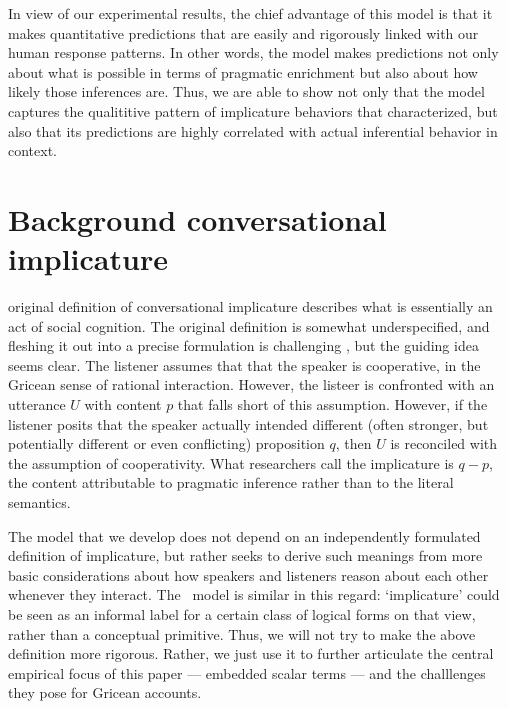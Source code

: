 \documentclass{article}
\begin{document}
In view of our experimental results, the chief advantage of this model
is that it makes quantitative predictions that are easily and
rigorously linked with our human response patterns.  In other words,
the model makes predictions not only about what is possible in terms
of pragmatic enrichment but also about how likely those inferences
are. Thus, we are able to show not only that the model captures the
qualititive pattern of implicature behaviors that
\citeauthor{Chemla:Spector:2011} characterized, but also that its
predictions are highly correlated with actual inferential behavior in
context.



\section{Background  conversational implicature}\label{sec:implicature}

 original definition of conversational implicature
describes what is essentially an act of social cognition. The original
definition is somewhat underspecified, and fleshing it out into a
precise formulation is challenging \citep{Hirschberg85}, but the
guiding idea seems clear.  The listener assumes that that the speaker
is cooperative, in the Gricean sense of rational interaction. However,
the listeer is confronted with an utterance $U$ with content $p$ that
falls short of this assumption. However, if the listener posits that
the speaker actually intended different (often stronger, but
potentially different or even conflicting) proposition $q$, then $U$
is reconciled with the assumption of cooperativity. What researchers
call the implicature is $q - p$, the content attributable to pragmatic
inference rather than to the literal semantics.

The model that we develop does not depend on an independently
formulated definition of implicature, but rather seeks to derive such
meanings from more basic considerations about how speakers and
listeners reason about each other whenever they interact. The \CFS\
model is similar in this regard: `implicature' could be seen as an
informal label for a certain class of logical forms on that view,
rather than a conceptual primitive. Thus, we will not try to make the
above definition more rigorous. Rather, we just use it to further
articulate the central empirical focus of this paper --- embedded
scalar terms --- and the challlenges they pose for Gricean accounts.
\end{document}
